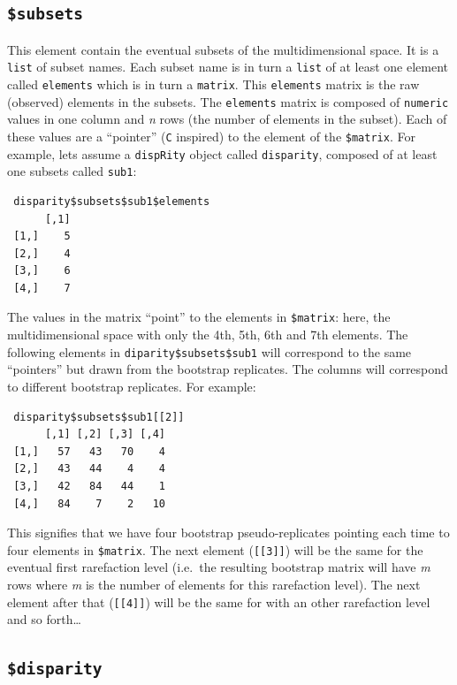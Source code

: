 \documentclass[]{book}
\theoremstyle{definition}
\theoremstyle{definition}
\theoremstyle{remark}
\begin{document}
\subsection{\texorpdfstring{\texttt{\$subsets}}{\$subsets}}\label{subsets}

This element contain the eventual subsets of the multidimensional space.
It is a \texttt{list} of subset names. Each subset name is in turn a
\texttt{list} of at least one element called \texttt{elements} which is
in turn a \texttt{matrix}. This \texttt{elements} matrix is the raw
(observed) elements in the subsets. The \texttt{elements} matrix is
composed of \texttt{numeric} values in one column and \emph{n} rows (the
number of elements in the subset). Each of these values are a
``pointer'' (\texttt{C} inspired) to the element of the
\texttt{\$matrix}. For example, lets assume a \texttt{dispRity} object
called \texttt{disparity}, composed of at least one subsets called
\texttt{sub1}:

\begin{verbatim}
 disparity$subsets$sub1$elements
      [,1]
 [1,]    5
 [2,]    4
 [3,]    6
 [4,]    7
\end{verbatim}

The values in the matrix ``point'' to the elements in \texttt{\$matrix}:
here, the multidimensional space with only the 4th, 5th, 6th and 7th
elements. The following elements in \texttt{diparity\$subsets\$sub1}
will correspond to the same ``pointers'' but drawn from the bootstrap
replicates. The columns will correspond to different bootstrap
replicates. For example:

\begin{verbatim}
 disparity$subsets$sub1[[2]]
      [,1] [,2] [,3] [,4]
 [1,]   57   43   70    4
 [2,]   43   44    4    4
 [3,]   42   84   44    1
 [4,]   84    7    2   10
\end{verbatim}

This signifies that we have four bootstrap pseudo-replicates pointing
each time to four elements in \texttt{\$matrix}. The next element
(\texttt{{[}{[}3{]}{]}}) will be the same for the eventual first
rarefaction level (i.e.~the resulting bootstrap matrix will have
\emph{m} rows where \emph{m} is the number of elements for this
rarefaction level). The next element after that (\texttt{{[}{[}4{]}{]}})
will be the same for with an other rarefaction level and so
forth\ldots{}

\subsection{\texorpdfstring{\texttt{\$disparity}}{\$disparity}}\label{disparity}
\end{document}
